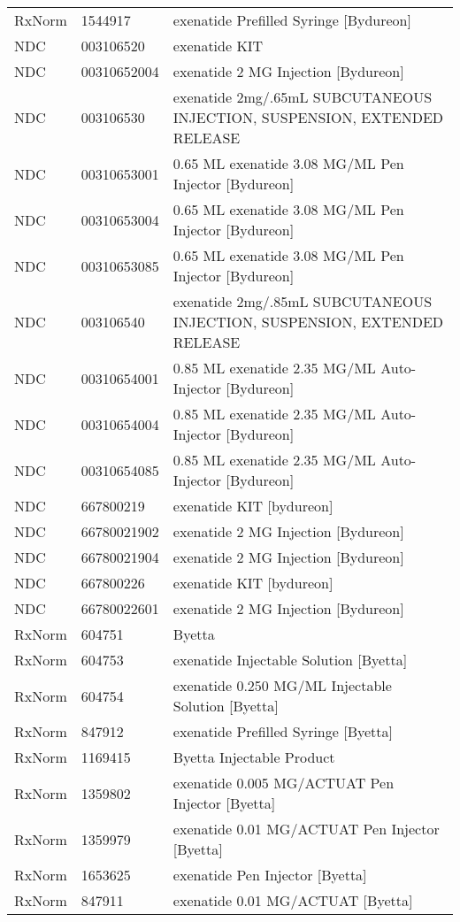 \begin{longtable}{p{}p{}p{}}
  RxNorm & 1544917 & exenatide Prefilled Syringe [Bydureon] \\ 
  NDC & 003106520 & exenatide KIT \\ 
  NDC & 00310652004 & exenatide 2 MG Injection [Bydureon] \\ 
  NDC & 003106530 & exenatide 2mg/.65mL SUBCUTANEOUS INJECTION, SUSPENSION, EXTENDED RELEASE \\ 
  NDC & 00310653001 & 0.65 ML exenatide 3.08 MG/ML Pen Injector [Bydureon] \\ 
  NDC & 00310653004 & 0.65 ML exenatide 3.08 MG/ML Pen Injector [Bydureon] \\ 
  NDC & 00310653085 & 0.65 ML exenatide 3.08 MG/ML Pen Injector [Bydureon] \\ 
  NDC & 003106540 & exenatide 2mg/.85mL SUBCUTANEOUS INJECTION, SUSPENSION, EXTENDED RELEASE \\ 
  NDC & 00310654001 & 0.85 ML exenatide 2.35 MG/ML Auto-Injector [Bydureon] \\ 
  NDC & 00310654004 & 0.85 ML exenatide 2.35 MG/ML Auto-Injector [Bydureon] \\ 
  NDC & 00310654085 & 0.85 ML exenatide 2.35 MG/ML Auto-Injector [Bydureon] \\ 
  NDC & 667800219 & exenatide KIT [bydureon] \\ 
  NDC & 66780021902 & exenatide 2 MG Injection [Bydureon] \\ 
  NDC & 66780021904 & exenatide 2 MG Injection [Bydureon] \\ 
  NDC & 667800226 & exenatide KIT [bydureon] \\ 
  NDC & 66780022601 & exenatide 2 MG Injection [Bydureon] \\ 
  RxNorm & 604751 & Byetta \\ 
  RxNorm & 604753 & exenatide Injectable Solution [Byetta] \\ 
  RxNorm & 604754 & exenatide 0.250 MG/ML Injectable Solution [Byetta] \\ 
  RxNorm & 847912 & exenatide Prefilled Syringe [Byetta] \\ 
  RxNorm & 1169415 & Byetta Injectable Product \\ 
  RxNorm & 1359802 & exenatide 0.005 MG/ACTUAT Pen Injector [Byetta] \\ 
  RxNorm & 1359979 & exenatide 0.01 MG/ACTUAT Pen Injector [Byetta] \\ 
  RxNorm & 1653625 & exenatide Pen Injector [Byetta] \\ 
  RxNorm & 847911 & exenatide 0.01 MG/ACTUAT [Byetta] \\ 

\end{longtable}
